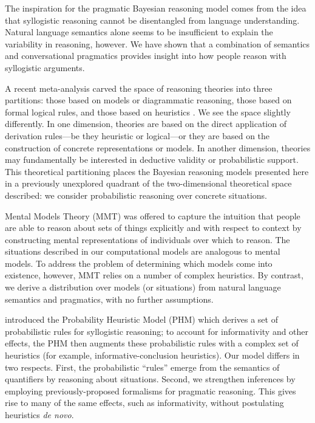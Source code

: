\documentclass[10pt,letterpaper]{article}
\begin{document}
The inspiration for the pragmatic Bayesian reasoning model comes from the idea that syllogistic reasoning cannot be disentangled from language understanding. Natural language semantics alone seems to be insufficient to explain the variability in reasoning, however. We have shown that a combination of semantics and conversational pragmatics provides insight into how people reason with syllogistic arguments. 

A recent meta-analysis carved the space of reasoning theories into three partitions: those based on models or diagrammatic reasoning, those based on formal logical rules, and those based on heuristics \cite{Khemlani2012}. We see the space slightly differently. In one dimension, theories are based on the direct application of derivation rules---be they heuristic or logical---or they are based on the construction of concrete representations or models. In another dimension, theories may fundamentally be interested in deductive validity or probabilistic support. This theoretical partitioning places the Bayesian reasoning models presented here in a previously unexplored quadrant of the two-dimensional theoretical space described: we consider probabilistic reasoning over concrete situations.

Mental Models Theory (MMT) was offered to capture the intuition that people are able to reason about sets of things explicitly and with respect to context by constructing mental representations of individuals over which to reason. The situations described in our computational models are analogous to mental models. To address the problem of determining which models come into existence, however, MMT relies on a number of complex heuristics. By contrast, we derive a distribution over models (or situations) from natural language semantics and pragmatics, with no further assumptions.


 introduced the Probability Heuristic Model (PHM) which derives a set of probabilistic rules for syllogistic reasoning; to account for informativity and other effects, the PHM then augments these probabilistic rules with a complex set of heuristics (for example, informative-conclusion heuristics). Our model differs in two respects. First, the probabilistic ``rules'' emerge from the semantics of quantifiers by reasoning about situations. Second, we strengthen inferences by employing previously-proposed formalisms for pragmatic reasoning. This gives rise to many of the same effects, such as informativity, without postulating heuristics \emph{de novo}.
\end{document}
